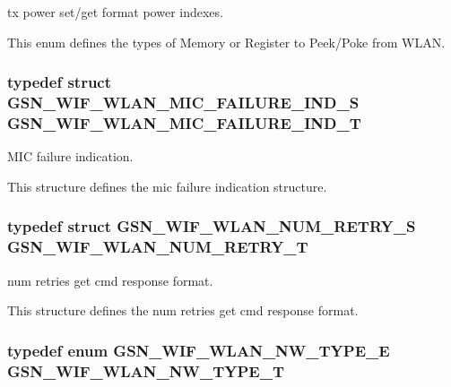 tx power set/get format power indexes. 

This enum defines the types of Memory or Register to Peek/Poke from WLAN. \hypertarget{a00677_ga7692f300e14cded7c79c50838226ed2b}{
\subsubsection[{GSN\_\-WIF\_\-WLAN\_\-MIC\_\-FAILURE\_\-IND\_\-T}]{\setlength{\rightskip}{0pt plus 5cm}typedef struct {\bf GSN\_\-WIF\_\-WLAN\_\-MIC\_\-FAILURE\_\-IND\_\-S}  {\bf GSN\_\-WIF\_\-WLAN\_\-MIC\_\-FAILURE\_\-IND\_\-T}}}
\label{a00677_ga7692f300e14cded7c79c50838226ed2b}


MIC failure indication. 

This structure defines the mic failure indication structure. \hypertarget{a00677_ga941d2bc71947bd100c963211cf48a341}{
\subsubsection[{GSN\_\-WIF\_\-WLAN\_\-NUM\_\-RETRY\_\-T}]{\setlength{\rightskip}{0pt plus 5cm}typedef struct {\bf GSN\_\-WIF\_\-WLAN\_\-NUM\_\-RETRY\_\-S}  {\bf GSN\_\-WIF\_\-WLAN\_\-NUM\_\-RETRY\_\-T}}}
\label{a00677_ga941d2bc71947bd100c963211cf48a341}


num retries get cmd response format. 

This structure defines the num retries get cmd response format. \hypertarget{a00677_gabc852e0cb262314c5f307a3e9802921e}{
\subsubsection[{GSN\_\-WIF\_\-WLAN\_\-NW\_\-TYPE\_\-T}]{\setlength{\rightskip}{0pt plus 5cm}typedef enum {\bf GSN\_\-WIF\_\-WLAN\_\-NW\_\-TYPE\_\-E}  {\bf GSN\_\-WIF\_\-WLAN\_\-NW\_\-TYPE\_\-T}}}
\label{a00677_gabc852e0cb262314c5f307a3e9802921e}


